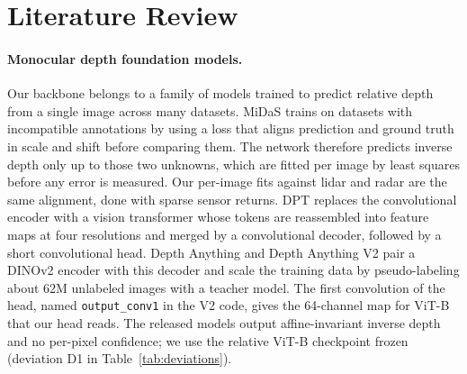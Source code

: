 %
%
\section{Literature Review}
\label{sec:lit}

\paragraph{Monocular depth foundation models.}
Our backbone belongs to a family of models trained to predict relative depth from a single image across many datasets. MiDaS \citep{ranftl2020midas} trains on datasets with incompatible annotations by using a loss that aligns prediction and ground truth in scale and shift before comparing them. The network therefore predicts inverse depth only up to those two unknowns, which are fitted per image by least squares before any error is measured. Our per-image fits against lidar and radar are the same alignment, done with sparse sensor returns. DPT \citep{ranftl2021dpt} replaces the convolutional encoder with a vision transformer whose tokens are reassembled into feature maps at four resolutions and merged by a convolutional decoder, followed by a short convolutional head. Depth Anything \citep{yang2024depthanything} and Depth Anything V2 \citep{yang2024depthanythingv2} pair a DINOv2 encoder with this decoder and scale the training data by pseudo-labeling about 62M unlabeled images with a teacher model. The first convolution of the head, named \texttt{output\_conv1} in the V2 code, gives the 64-channel map for ViT-B that our head reads. The released models output affine-invariant inverse depth and no per-pixel confidence; we use the relative ViT-B checkpoint frozen (deviation D1 in Table~\ref{tab:deviations}).

